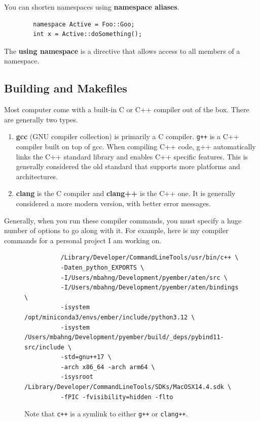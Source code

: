 \documentclass{article}
\newcounter{example}[section]
\newcounter{code}[section]
\begin{document}
    \begin{lemma}
      \label{thm:namespace-aliases}
      You can shorten namespaces using \textbf{namespace aliases}. 
      \begin{lstlisting}
        namespace Active = Foo::Goo; 
        int x = Active::doSomething(); 
      \end{lstlisting}
    \end{lemma}

    \begin{lemma}
      \label{thm:using-namespace}
      The \textbf{using namespace} is a directive that allows access to all members of a namespace. 
    \end{lemma}

  \subsection{Building and Makefiles}
    
      Most computer come with a built-in C or C++ compiler out of the box. There are generally two types. 
      \begin{enumerate}
        \item \textbf{gcc} (GNU compiler collection) is primarily a C compiler. \texttt{g++} is a C++ compiler built on top of gcc. When compiling C++ code, g++ automatically links the C++ standard library and enables C++ specific features. This is generally considered the old standard that supports more platforms and architectures.  
        \item \textbf{clang} is the C compiler and \textbf{clang++} is the C++ one. It is generally considered a more modern version, with better error messages. 
      \end{enumerate} 

      Generally, when you run these compiler commands, you must specify a huge number of options to go along with it. For example, here is my compiler commands for a personal project I am working on. 

      \begin{figure}[H]
        \centering 
        \begin{lstlisting}
          /Library/Developer/CommandLineTools/usr/bin/c++ \
          -Daten_python_EXPORTS \
          -I/Users/mbahng/Development/pyember/aten/src \
          -I/Users/mbahng/Development/pyember/aten/bindings \
          -isystem /opt/miniconda3/envs/ember/include/python3.12 \
          -isystem /Users/mbahng/Development/pyember/build/_deps/pybind11-src/include \
          -std=gnu++17 \
          -arch x86_64 -arch arm64 \
          -isysroot /Library/Developer/CommandLineTools/SDKs/MacOSX14.4.sdk \
          -fPIC -fvisibility=hidden -flto 
        \end{lstlisting}
        \caption{Note that \texttt{c++} is a symlink to either \texttt{g++} or \texttt{clang++}.} 
        \label{fig:com_code}
      \end{figure} 
\end{document}
